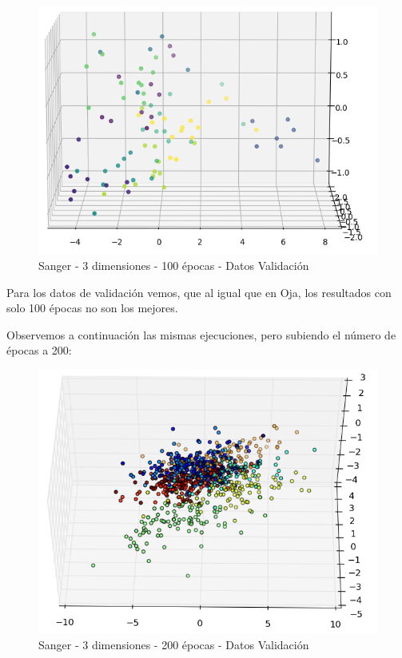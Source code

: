 \begin{figure}[h]
  \begin{center}
    \includegraphics[scale=0.65]{../img/ej1/sanger/sanger_3salida_100ep_validation_2.png}
  \caption{Sanger - 3 dimensiones - 100 épocas - Datos Validación}
  \end{center}
\end{figure}

\newpage

Para los datos de validación vemos, que al igual que en Oja, los resultados con solo 100 épocas no son los mejores.

Observemos a continuación las mismas ejecuciones, pero subiendo el número de épocas a 200:

\begin{figure}[h]
  \begin{center}
    \includegraphics[scale=0.75]{../img/ej1/sanger/sanger_3salida_200ep_train_2.png}
  \caption{Sanger - 3 dimensiones - 200 épocas - Datos Validación}
  \end{center}
\end{figure}

